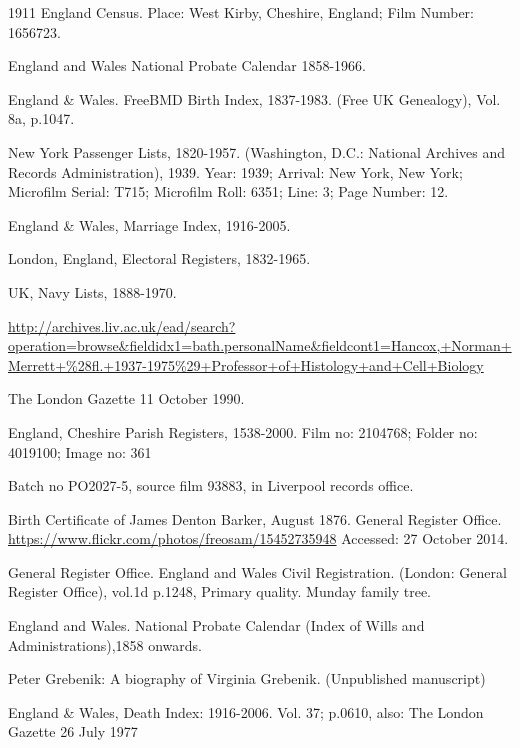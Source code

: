 \begin{thebibliography}{99}
	1911 England Census. Place: West Kirby, Cheshire, England; Film Number: 1656723.

	England and Wales National Probate Calendar 1858-1966.

	England \& Wales. FreeBMD Birth Index, 1837-1983. (Free UK Genealogy), Vol. 8a, p.1047.

	New York Passenger Lists, 1820-1957. (Washington, D.C.: National Archives and Records Administration), 1939.
	Year: 1939; Arrival: New York, New York; Microfilm Serial: T715; Microfilm Roll: 6351; Line: 3; Page Number: 12.

	England \& Wales, Marriage Index, 1916-2005.

	 London, England, Electoral Registers, 1832-1965.

	 UK, Navy Lists, 1888-1970.

	\url{http://archives.liv.ac.uk/ead/search?operation=browse&fieldidx1=bath.personalName&fieldcont1=Hancox,+Norman+Merrett+\%28fl.+1937-1975\%29+Professor+of+Histology+and+Cell+Biology}

	The London Gazette 11 October 1990.

	England, Cheshire Parish Registers, 1538-2000.
	Film no: 2104768; Folder no: 4019100; Image no: 361

	Batch no PO2027-5, source film 93883, in Liverpool records office.

	Birth Certificate of James Denton Barker, August 1876. General Register Office.
	\url{https://www.flickr.com/photos/freosam/15452735948}
	Accessed: 27 October 2014.

	General Register Office. England and Wales Civil Registration. (London: General Register Office), vol.1d p.1248, Primary quality.
	Munday family tree.

	England and Wales. National Probate Calendar (Index of Wills and Administrations),1858 onwards.

	Peter Grebenik: A biography of Virginia Grebenik. (Unpublished manuscript)

	England \& Wales, Death Index: 1916-2006. Vol. 37; p.0610, also:
	The London Gazette 26 July 1977


\end{thebibliography}
